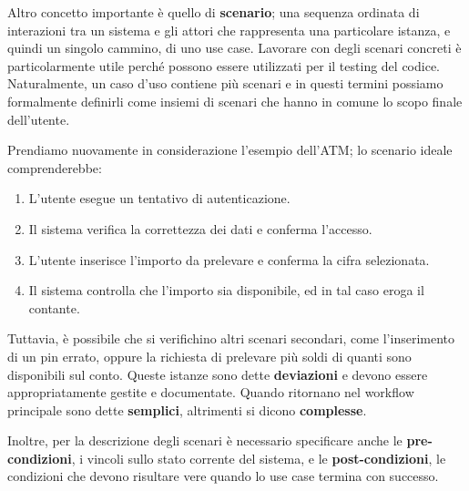 \noindent Altro concetto importante è quello di \textbf{scenario}; una sequenza ordinata di interazioni tra un sistema e gli attori che rappresenta una
particolare istanza, e quindi un singolo cammino, di uno use case. Lavorare con degli scenari concreti è particolarmente utile perché possono essere
utilizzati per il testing del codice. Naturalmente, un caso d'uso contiene più scenari e in questi termini possiamo formalmente definirli come insiemi
di scenari che hanno in comune lo scopo finale dell'utente.\par
Prendiamo nuovamente in considerazione l'esempio dell'ATM; lo scenario ideale comprenderebbe: \begin{enumerate}
	\item L'utente esegue un tentativo di autenticazione.
	\item Il sistema verifica la correttezza dei dati e conferma l'accesso.
	\item L'utente inserisce l'importo da prelevare e conferma la cifra selezionata.
	\item Il sistema controlla che l'importo sia disponibile, ed in tal caso eroga il contante. 
\end{enumerate}
\noindent Tuttavia, è possibile che si verifichino altri scenari secondari, come l'inserimento di un pin errato, oppure la richiesta di prelevare più
soldi di quanti sono disponibili sul conto. Queste istanze sono dette \textbf{deviazioni} e devono essere appropriatamente gestite e documentate. Quando
ritornano nel workflow principale sono dette \textbf{semplici}, altrimenti si dicono \textbf{complesse}.\par
Inoltre, per la descrizione degli scenari è necessario specificare anche le \textbf{pre-condizioni}, i vincoli sullo stato corrente del sistema, e le
\textbf{post-condizioni}, le condizioni che devono risultare vere quando lo use case termina con successo.\newline

